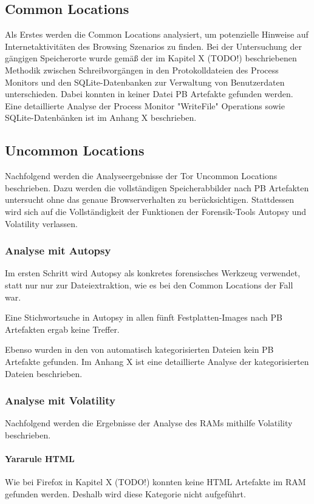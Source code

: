 \subsection*{Common Locations}

Als Erstes werden die Common Locations analysiert, um potenzielle Hinweise auf Internetaktivitäten des Browsing Szenarios zu finden. Bei der Untersuchung der gängigen Speicherorte wurde gemäß der im Kapitel X (TODO!) beschriebenen Methodik zwischen Schreibvorgängen in den Protokolldateien des Process Monitors und den SQLite-Datenbanken zur Verwaltung von Benutzerdaten unterschieden. Dabei konnten in keiner Datei PB Artefakte gefunden werden. Eine detaillierte Analyse der Process Monitor "WriteFile" Operations sowie SQLite-Datenbänken ist im Anhang X beschrieben.

\subsection*{Uncommon Locations}
Nachfolgend werden die Analyseergebnisse der Tor Uncommon Locations beschrieben.
Dazu werden die vollständigen Speicherabbilder nach PB Artefakten untersucht ohne das genaue Browserverhalten zu berücksichtigen. Stattdessen wird sich auf die Vollständigkeit der Funktionen der Forensik-Tools Autopsy und Volatility verlassen.

\subsubsection*{Analyse mit Autopsy}

Im ersten Schritt wird Autopsy als konkretes forensisches Werkzeug verwendet, statt nur nur zur Dateiextraktion, wie es bei den Common Locations der Fall war.

Eine Stichwortsuche in Autopsy in allen fünft Festplatten-Images nach PB Artefakten ergab keine Treffer.

Ebenso wurden in den von automatisch kategorisierten Dateien kein PB Artefakte gefunden. 
Im Anhang X ist eine detaillierte Analyse der kategorisierten Dateien beschrieben.


\subsubsection*{Analyse mit Volatility}

Nachfolgend werden die Ergebnisse der Analyse des RAMs mithilfe Volatility beschrieben. 

\paragraph*{Yararule HTML}
Wie bei Firefox in Kapitel X (TODO!) konnten keine HTML Artefakte im RAM gefunden werden. Deshalb wird diese Kategorie nicht aufgeführt.

